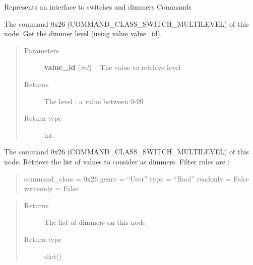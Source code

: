 \documentclass[letterpaper,10pt,english]{sphinxmanual}
\begin{document}
\begin{fulllineitems}
\label{command:openzwave.command.ZWaveNodeSwitch}
Represents an interface to switches and dimmers Commands

\begin{fulllineitems}
\label{command:openzwave.command.ZWaveNodeSwitch.get_dimmer_level}
The command 0x26 (COMMAND\_CLASS\_SWITCH\_MULTILEVEL) of this node.
Get the dimmer level (using value value\_id).
\begin{quote}\begin{description}
\item[{Parameters}] \leavevmode
\textbf{value\_id} (\emph{int}) -- The value to retrieve level

\item[{Returns}] \leavevmode
The level : a value between 0-99

\item[{Return type}] \leavevmode
int

\end{description}\end{quote}

\end{fulllineitems}


\begin{fulllineitems}
\label{command:openzwave.command.ZWaveNodeSwitch.get_dimmers}
The command 0x26 (COMMAND\_CLASS\_SWITCH\_MULTILEVEL) of this node.
Retrieve the list of values to consider as dimmers.
Filter rules are :
\begin{quote}

command\_class = 0x26
genre = ``User''
type = ``Bool''
readonly = False
writeonly = False
\end{quote}
\begin{quote}\begin{description}
\item[{Returns}] \leavevmode
The list of dimmers on this node

\item[{Return type}] \leavevmode
dict()

\end{description}\end{quote}


\end{fulllineitems}
\end{fulllineitems}
\end{document}
